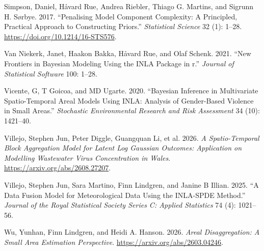 \documentclass[
  letterpaper,
  DIV=11,
  numbers=noendperiod]{scrartcl}
\newlength{\cslhangindent}
\newenvironment{CSLReferences}[2] %
 {\begin{list}{}{%
  \setlength{\itemindent}{0pt}
  \setlength{\leftmargin}{0pt}
  \setlength{\parsep}{0pt}
  \ifodd #1
   \setlength{\leftmargin}{\cslhangindent}
   \setlength{\itemindent}{-1\cslhangindent}
  \fi
  \setlength{\itemsep}{#2\baselineskip}}}
 {\end{list}}
\begin{document}
\begin{CSLReferences}{1}{1}
Simpson, Daniel, Håvard Rue, Andrea Riebler, Thiago G. Martins, and
Sigrunn H. Sørbye. 2017. {``Penalising Model Component Complexity: A
Principled, Practical Approach to Constructing Priors.''}
\emph{Statistical Science} 32 (1): 1--28.
\url{https://doi.org/10.1214/16-STS576}.

Van Niekerk, Janet, Haakon Bakka, Håvard Rue, and Olaf Schenk. 2021.
{``New Frontiers in Bayesian Modeling Using the INLA Package in r.''}
\emph{Journal of Statistical Software} 100: 1--28.

Vicente, G, T Goicoa, and MD Ugarte. 2020. {``Bayesian Inference in
Multivariate Spatio-Temporal Areal Models Using INLA: Analysis of
Gender-Based Violence in Small Areas.''} \emph{Stochastic Environmental
Research and Risk Assessment} 34 (10): 1421--40.

Villejo, Stephen Jun, Peter Diggle, Guangquan Li, et al. 2026. \emph{A
Spatio-Temporal Block Aggregation Model for Latent Log Gaussian
Outcomes: Application on Modelling Wastewater Virus Concentration in
Wales}. \url{https://arxiv.org/abs/2608.27207}.

Villejo, Stephen Jun, Sara Martino, Finn Lindgren, and Janine B Illian.
2025. {``A Data Fusion Model for Meteorological Data Using the INLA-SPDE
Method.''} \emph{Journal of the Royal Statistical Society Series C:
Applied Statistics} 74 (4): 1021--56.

Wu, Yunhan, Finn Lindgren, and Heidi A. Hanson. 2026. \emph{Areal
Disaggregation: A Small Area Estimation Perspective}.
\url{https://arxiv.org/abs/2603.04246}.

\end{CSLReferences}
\end{document}
